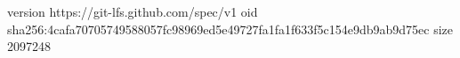 version https://git-lfs.github.com/spec/v1
oid sha256:4cafa70705749588057fc98969ed5e49727fa1fa1f633f5c154e9db9ab9d75ec
size 2097248
